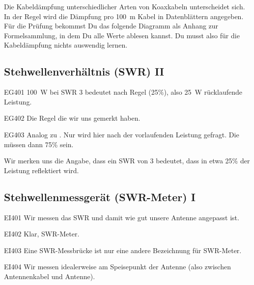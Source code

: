 \begin{ohmchapter}
Die Kabeldämpfung unterschiedlicher Arten von Koaxkabeln unterscheidet sich. In der Regel wird die Dämpfung pro \SI{100}{\meter} Kabel in Datenblättern angegeben.
Für die Prüfung bekommst Du das folgende Diagramm als Anhang zur Formelsammlung, in dem Du alle Werte ablesen kannst. Du musst also für die Kabeldämpfung nichts auswendig lernen.

\end{ohmchapter}


\subsection{Stehwellenverhältnis (SWR) II}


\begin{sol}{EG401}
 \SI{100}{\watt} bei SWR 3 bedeutet nach Regel (25\%), also \SI{25}{\watt} rücklaufende Leistung.
\end{sol}


\begin{sol}{EG402}
 Die Regel die wir uns gemerkt haben.
\end{sol}


\begin{sol}{EG403}
 Analog zu . Nur wird hier nach der vorlaufenden Leistung gefragt. Die müssen dann 75\% sein.
\end{sol}


\begin{ohmchapter}
Wir merken uns die Angabe, dass ein SWR von 3 bedeutet, dass in etwa 25\% der Leistung reflektiert wird.
\end{ohmchapter}

\subsection{Stehwellenmessgerät (SWR-Meter) I}

\begin{sol}{EI401}
Wir messen das SWR und damit wie gut unsere Antenne angepasst ist.
\end{sol}
\begin{sol}{EI402}
Klar, SWR-Meter.
\end{sol}

\begin{sol}{EI403}
Eine SWR-Messbrücke ist nur eine andere Bezeichnung für SWR-Meter.
\end{sol}

\begin{sol}{EI404}
Wir messen idealerweise am Speisepunkt der Antenne (also zwischen Antennenkabel und Antenne).
\end{sol}


